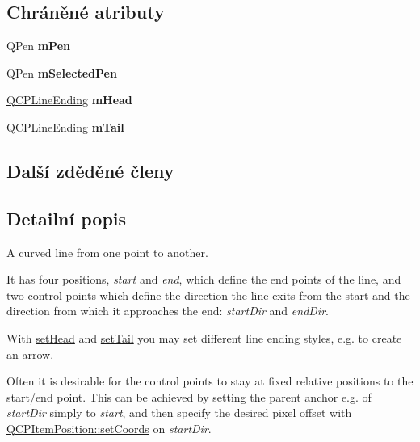 \subsection*{Chráněné atributy}
\begin{DoxyCompactItemize}
\item 
\hypertarget{classQCPItemCurve_a7ef92988d1db2e4d0311e34c0a57fe42}{}Q\+Pen {\bfseries m\+Pen}\label{classQCPItemCurve_a7ef92988d1db2e4d0311e34c0a57fe42}

\item 
\hypertarget{classQCPItemCurve_ab22cbab261b20be5aa8e4ca252149246}{}Q\+Pen {\bfseries m\+Selected\+Pen}\label{classQCPItemCurve_ab22cbab261b20be5aa8e4ca252149246}

\item 
\hypertarget{classQCPItemCurve_af2cc26ff199570940dc96f5ec19a13f8}{}\hyperlink{classQCPLineEnding}{Q\+C\+P\+Line\+Ending} {\bfseries m\+Head}\label{classQCPItemCurve_af2cc26ff199570940dc96f5ec19a13f8}

\item 
\hypertarget{classQCPItemCurve_af1dca285b97e3f5b892dab827a79f327}{}\hyperlink{classQCPLineEnding}{Q\+C\+P\+Line\+Ending} {\bfseries m\+Tail}\label{classQCPItemCurve_af1dca285b97e3f5b892dab827a79f327}

\end{DoxyCompactItemize}
\subsection*{Další zděděné členy}


\subsection{Detailní popis}
A curved line from one point to another. 

 It has four positions, {\itshape start} and {\itshape end}, which define the end points of the line, and two control points which define the direction the line exits from the start and the direction from which it approaches the end\+: {\itshape start\+Dir} and {\itshape end\+Dir}.

With \hyperlink{classQCPItemCurve_a08a30d9cdd63995deea3d9e20430676f}{set\+Head} and \hyperlink{classQCPItemCurve_ac3488d8b1a6489c845dc5bff3ef71124}{set\+Tail} you may set different line ending styles, e.\+g. to create an arrow.

Often it is desirable for the control points to stay at fixed relative positions to the start/end point. This can be achieved by setting the parent anchor e.\+g. of {\itshape start\+Dir} simply to {\itshape start}, and then specify the desired pixel offset with \hyperlink{classQCPItemPosition_aa988ba4e87ab684c9021017dcaba945f}{Q\+C\+P\+Item\+Position\+::set\+Coords} on {\itshape start\+Dir}. 

